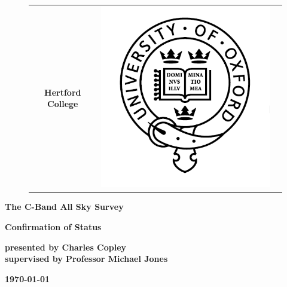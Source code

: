 \documentclass[english,a4paper,titlepage,12pt]{article}
\begin{document}
\begin{center}
\begin{figure}[ht]
\begin{tabular}{ccc}
\begin{minipage}{9cm}
\textbf{\large Hertford College}
\end{minipage}
&
\begin{minipage}{3cm}
\includegraphics[scale=0.25]{./images/logos/OxfordLogo.png}
\end{minipage}
\end{tabular}
\end{figure}
\vspace{4 cm}



\textbf{\huge The C-Band All Sky Survey}
\vspace{1 cm}


\textbf{{\large Confirmation of Status}}
\vspace{7 cm}


\textbf{\large presented by Charles Copley\\supervised by Professor Michael Jones}
\vspace{1 cm}

\textbf{\today}
\end{center}
\cleardoublepage
\end{document}
